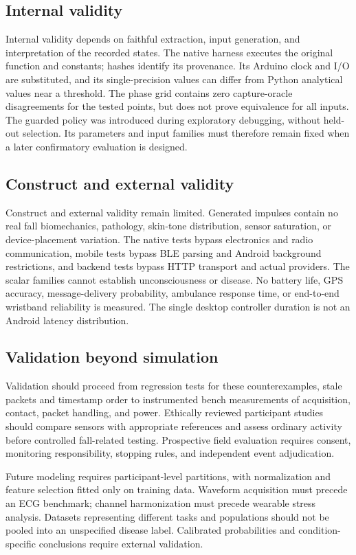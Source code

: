 \documentclass[journal]{IEEEtran}
\begin{document}
\subsection{Internal validity}
Internal validity depends on faithful extraction, input generation, and interpretation of the recorded states. The native harness executes the original function and constants; hashes identify its provenance. Its Arduino clock and I/O are substituted, and its single-precision values can differ from Python analytical values near a threshold. The phase grid contains zero capture-oracle disagreements for the tested points, but does not prove equivalence for all inputs. The guarded policy was introduced during exploratory debugging, without held-out selection. Its parameters and input families must therefore remain fixed when a later confirmatory evaluation is designed.

\subsection{Construct and external validity}
Construct and external validity remain limited. Generated impulses contain no real fall biomechanics, pathology, skin-tone distribution, sensor saturation, or device-placement variation. The native tests bypass electronics and radio communication, mobile tests bypass BLE parsing and Android background restrictions, and backend tests bypass HTTP transport and actual providers. The scalar families cannot establish unconsciousness or disease. No battery life, GPS accuracy, message-delivery probability, ambulance response time, or end-to-end wristband reliability is measured. The single desktop controller duration is not an Android latency distribution.

\subsection{Validation beyond simulation}
Validation should proceed from regression tests for these counterexamples, stale packets and timestamp order to instrumented bench measurements of acquisition, contact, packet handling, and power. Ethically reviewed participant studies should compare sensors with appropriate references and assess ordinary activity before controlled fall-related testing. Prospective field evaluation requires consent, monitoring responsibility, stopping rules, and independent event adjudication.

Future modeling requires participant-level partitions, with normalization and feature selection fitted only on training data. Waveform acquisition must precede an ECG benchmark; channel harmonization must precede wearable stress analysis. Datasets representing different tasks and populations should not be pooled into an unspecified disease label. Calibrated probabilities and condition-specific conclusions require external validation.
\end{document}
